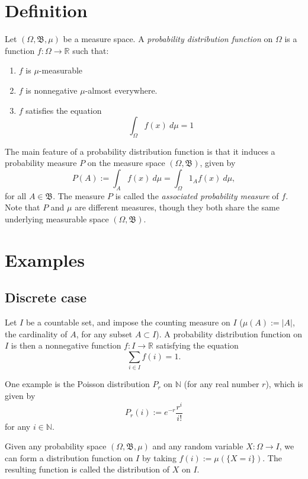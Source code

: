 \documentclass[12pt]{article}
\newcommand{\borel}{\mathfrak{B}}
\newcommand{\reals}{\mathbb{R}}
\newcommand{\naturals}{\mathbb{N}}
\begin{document}
\section{Definition}

Let $(\Omega, \borel, \mu)$ be a measure space.  A {\em probability distribution function} on $\Omega$ is a function $f: \Omega \longrightarrow \reals$ such that:
\begin{enumerate}
\item $f$ is $\mu$-measurable
\item $f$ is nonnegative $\mu$-almost everywhere.
\item $f$ satisfies the equation
$$
\int_{\Omega} f(x)\ d\mu = 1
$$
\end{enumerate}

The main feature of a probability distribution function is that it induces a probability measure $P$ on the measure space $(\Omega, \borel)$, given by
$$
P(A) := \int_A f(x)\ d\mu = \int_{\Omega} 1_A f(x)\ d\mu,
$$
for all $A \in \borel$. The measure $P$ is called the {\em associated probability measure} of $f$. Note that $P$ and $\mu$ are different measures,  though they both share the same underlying measurable space $(\Omega, \borel)$.
\section{Examples}

\subsection{Discrete case} Let $I$ be a countable set, and impose the counting measure on $I$ ($\mu(A) := |A|$, the cardinality of $A$, for any subset $A \subset I$). A probability distribution function on $I$ is then a nonnegative function $f: I \longrightarrow \reals$ satisfying the equation
$$
\sum_{i \in I} f(i) = 1.
$$

One example is the Poisson distribution $P_r$ on $\naturals$ (for any real number $r$), which is given by 
$$
P_r(i) := e^{-r} \frac{r^i}{i!}
$$
for any $i \in \naturals$.

Given any probability space $(\Omega, \borel, \mu)$ and any random variable $X: \Omega \longrightarrow I$, we can form a distribution function on $I$ by taking $f(i) := \mu(\{X = i\})$. The resulting function is called the distribution of $X$ on $I$.
\end{document}
